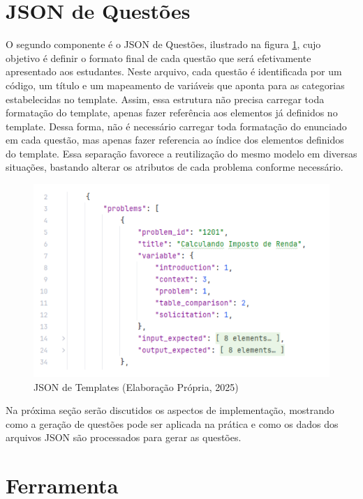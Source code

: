 \section{JSON de Questões}

O segundo componente é o JSON de Questões, ilustrado na figura \ref{fig:json-de-questoes}, cujo objetivo é definir o formato final de cada questão que será efetivamente apresentado aos estudantes. Neste arquivo, cada questão é identificada por um código, um título e um mapeamento de variáveis que aponta para as categorias estabelecidas no template. Assim, essa estrutura não precisa carregar toda formatação do template, apenas fazer referência aos elementos já definidos no template. Dessa forma, não é necessário carregar toda formatação do enunciado em cada questão, mas apenas fazer referencia ao índice dos elementos definidos do template. Essa separação favorece a reutilização do mesmo modelo em diversas situações, bastando alterar os atributos de cada problema conforme necessário.

\begin{figure}[ht]
	\centering
	\includegraphics[width=12cm]{./imagens/capitulo7/json-de-questoes}
	\caption{JSON de Templates (Elaboração Própria, 2025) }
	\label{fig:json-de-questoes}
\end{figure}
Na próxima seção serão discutidos os aspectos de implementação, mostrando como a geração de questões pode ser aplicada na prática e como os dados dos arquivos JSON são processados para gerar  as questões.

\section{Ferramenta}

